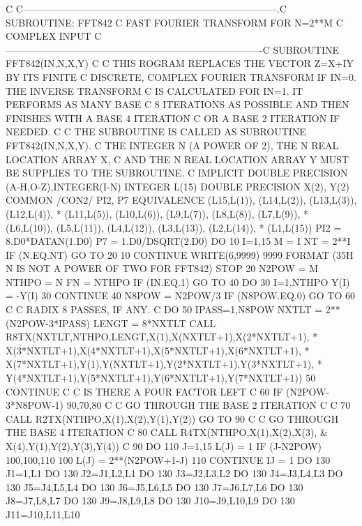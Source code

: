 C
C------------------------------------------------------------------------------.C SUBROUTINE: FFT842
C FAST FOURIER TRANSFORM FOR N=2**M
C COMPLEX INPUT
C-------------------------------------------------------------------------------C
      SUBROUTINE FFT842(IN,N,X,Y)
C
C THIS ROGRAM REPLACES THE VECTOR Z=X+IY BY ITS FINITE
C DISCRETE, COMPLEX FOURIER TRANSFORM IF IN=0.  THE INVERSE TRANSFORM
C IS CALCULATED FOR IN=1.  IT PERFORMS AS MANY BASE 
C 8 ITERATIONS AS POSSIBLE AND THEN FINISHES WITH A BASE 4 ITERATION
C OR A BASE 2 ITERATION IF NEEDED.
C
C THE SUBROUTINE IS CALLED AS SUBROUTINE FFT842(IN,N,X,Y).
C THE INTEGER N (A POWER OF 2), THE N REAL LOCATION ARRAY X,
C AND THE N REAL LOCATION ARRAY Y MUST BE SUPPLIES TO THE SUBROUTINE.
C
      IMPLICIT DOUBLE PRECISION (A-H,O-Z),INTEGER(I-N)
      INTEGER L(15)
      DOUBLE PRECISION X(2), Y(2)
      COMMON /CON2/ PI2, P7
      EQUIVALENCE (L15,L(1)), (L14,L(2)), (L13,L(3)), (L12,L(4)),
     *    (L11,L(5)), (L10,L(6)), (L9,L(7)), (L8,L(8)), (L7,L(9)),
     *    (L6,L(10)), (L5,L(11)), (L4,L(12)), (L3,L(13)), (L2,L(14)),
     *    (L1,L(15))
      PI2 = 8.D0*DATAN(1.D0)
      P7 = 1.D0/DSQRT(2.D0)
      DO 10 I=1,15
        M = I
        NT = 2**I
        IF (N.EQ.NT) GO TO 20
 10   CONTINUE
      WRITE(6,9999)
 9999 FORMAT (35H N IS NOT A POWER OF TWO FOR FFT842)
      STOP
 20   N2POW = M
      NTHPO = N
      FN = NTHPO
      IF (IN.EQ.1) GO TO 40
      DO 30 I=1,NTHPO
        Y(I) = -Y(I)
 30   CONTINUE
 40   N8POW = N2POW/3
      IF (N8POW.EQ.0) GO TO 60
C
C RADIX 8 PASSES, IF ANY.
C
      DO 50 IPASS=1,N8POW
        NXTLT = 2**(N2POW-3*IPASS)
        LENGT = 8*NXTLT
        CALL R8TX(NXTLT,NTHPO,LENGT,X(1),X(NXTLT+1),X(2*NXTLT+1),
     *      X(3*NXTLT+1),X(4*NXTLT+1),X(5*NXTLT+1),X(6*NXTLT+1),
     *      X(7*NXTLT+1),Y(1),Y(NXTLT+1),Y(2*NXTLT+1),Y(3*NXTLT+1),
     *      Y(4*NXTLT+1),Y(5*NXTLT+1),Y(6*NXTLT+1),Y(7*NXTLT+1))
 50   CONTINUE
C
C IS THERE A FOUR FACTOR LEFT
C
 60   IF (N2POW-3*N8POW-1) 90,70,80
C
C GO THROUGH THE BASE 2 ITERATION
C
C
 70   CALL R2TX(NTHPO,X(1),X(2),Y(1),Y(2))
      GO TO 90
C
C GO THROUGH THE BASE 4 ITERATION
C
 80   CALL R4TX(NTHPO,X(1),X(2),X(3),
     &      X(4),Y(1),Y(2),Y(3),Y(4))
C
 90   DO 110 J=1,15
        L(J) = 1
        IF (J-N2POW) 100,100,110
 100    L(J) = 2**(N2POW+1-J)
 110  CONTINUE
      IJ = 1
      DO 130 J1=1,L1
      DO 130 J2=J1,L2,L1
      DO 130 J3=J2,L3,L2
      DO 130 J4=J3,L4,L3
      DO 130 J5=J4,L5,L4
      DO 130 J6=J5,L6,L5
      DO 130 J7=J6,L7,L6
      DO 130 J8=J7,L8,L7
      DO 130 J9=J8,L9,L8
      DO 130 J10=J9,L10,L9
      DO 130 J11=J10,L11,L10
